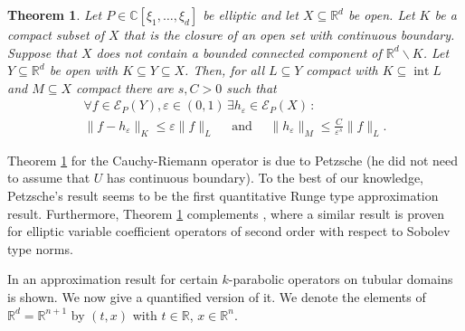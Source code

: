 \documentclass[12pt]{amsart}
\newcommand{\R}{\mathbb{R}}
\newcommand{\C}{\mathbb{C}}
\newtheorem{theorem}{Theorem}[section]
\theoremstyle{definition}
\theoremstyle{remark}
\numberwithin{equation}{section}
\begin{document}
 \begin{theorem}\label{theo: quantitative Lax-Malgrange}
	Let $P\in \C[\xi_1,\ldots,\xi_d]$ be elliptic and let $X\subseteq\R^d$ be open. Let $K$ be a compact subset of $X$ that is the closure of an open set with continuous boundary. Suppose that $X$ does not contain a bounded connected component of $\R^d\backslash K$. Let $Y \subseteq \R^d$ be open with $K\subseteq Y\subseteq X$.
	Then, for all $L \subseteq Y$ compact with $K \subseteq \operatorname{int} L$ and $M \subseteq X$ compact there are $s, C>0$ such that 
	\begin{gather*} 
	\forall f\in\mathscr{E}_P(Y), \varepsilon\in (0,1) \,\exists h_\varepsilon \in\mathscr{E}_P(X) \, :\\ \nonumber
	\|f-h_\varepsilon\|_{K}\leq \varepsilon\|f\|_{L} \quad \mbox{ and } \quad \|h_\varepsilon\|_{M}\leq\frac{C}{\varepsilon^s}\|f\|_{L}.
\end{gather*}
\end{theorem}
\noindent Theorem  \ref{theo: quantitative Lax-Malgrange} for the Cauchy-Riemann operator is due to Petzsche \cite[Theorem 4.2 (a)]{Petzsche1980} (he did not need to assume that $U$ has continuous boundary). To the best of our knowledge, Petzsche's result seems to be the first quantitative Runge  type approximation result. Furthermore, Theorem  \ref{theo: quantitative Lax-Malgrange} complements \cite[Theorem 3]{RuSa19}, where a similar result is proven  for elliptic variable coefficient  operators of second order with respect to  Sobolev type norms.

In \cite[Corollary 4]{Kalmes21} an approximation result for certain $k$-parabolic  operators  on tubular domains is shown. We now give a quantified version of it.  
We denote the elements of $ \R^d = \R^{n+1}$ by $(t,x)$ with $t\in\R$, $x\in\R^n$.
\end{document}
